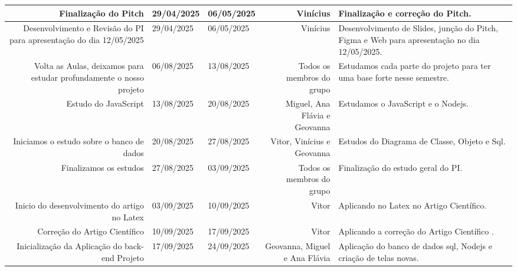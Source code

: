 \documentclass[
    landscape, %
    a4paper,
    12pt,
    brazilian,
]{article}
\newlength{\colAtividadeF}
\newlength{\colDataF}
\newlength{\colResponsavelF}
\begin{document}
\begin{center} 
\renewcommand{\arraystretch}{1.2} %

\begin{tabularx}{\textwidth}{|N{\colAtividadeF}|M{\colDataF}|M{\colDataF}|N{\colResponsavelF}|>{\raggedright\arraybackslash}X|}
\hline
Finalização do Pitch & 29/04/2025 & 06/05/2025 & Vinícius & Finalização e correção do Pitch.\\ \hline
Desenvolvimento e Revisão do PI para apresentação do dia 12/05/2025 & 29/04/2025 & 06/05/2025 & Vinícius & Desenvolvimento de Slides, junção do Pitch, Figma e Web para apresentação no dia 12/05/2025.\\ \hline
Volta as Aulas, deixamos para estudar profundamente o nosso projeto & 06/08/2025 & 13/08/2025 & Todos os membros do grupo & Estudamos cada parte do projeto para ter uma base forte nesse semestre.\\ \hline
Estudo do JavaScript & 13/08/2025 & 20/08/2025 & Miguel, Ana Flávia e Geovanna & Estudamos o JavaScript e o Nodejs.\\ \hline
Iniciamos o estudo sobre o banco de dados & 20/08/2025 & 27/08/2025 & Vitor, Vinícius e Geovanna & Estudos do Diagrama de Classe, Objeto e Sql.\\ \hline
Finalizamos os estudos& 27/08/2025 & 03/09/2025 & Todos os membros do grupo & Finalização do estudo geral do PI.\\ \hline
Inicio do desenvolvimento do artigo no Latex & 03/09/2025 & 10/09/2025 & Vitor & Aplicando no Latex no Artigo Científico.\\ \hline
Correção do Artigo Científico& 10/09/2025 & 17/09/2025 & Vitor &Aplicando a correção do Artigo Científico .\\ \hline
Inicialização da Aplicação do back-end Projeto& 17/09/2025 & 24/09/2025 & Geovanna, Miguel e Ana Flávia & Aplicação do banco de dados sql, Nodejs e criação de telas novas.\\ \hline
\end{tabularx}
\end{center} 
\end{document}

